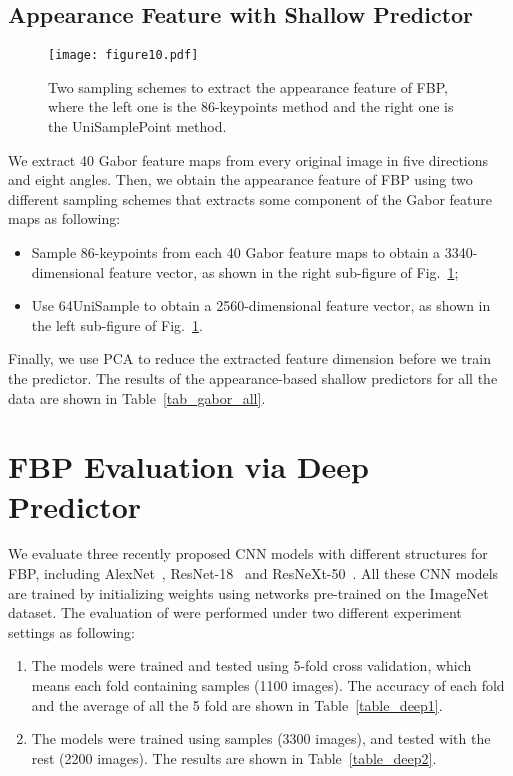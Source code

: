 \documentclass[10pt,conference,a4paper]{IEEEtran}
\begin{document}
\subsection{Appearance Feature with Shallow Predictor}
\begin{figure}[!t]
\centering
\texttt{[image: figure10.pdf]}
\caption{Two sampling schemes to extract the appearance feature of FBP, where the left one is the 86-keypoints method and the right one is the UniSamplePoint method.}
\label{fig_gabor_sample}
\end{figure}
We extract 40 Gabor feature maps from every original image in five directions and eight angles. Then, we obtain the appearance feature of FBP using two different sampling schemes that extracts some component of the Gabor feature maps as following:
\begin{itemize}
\item Sample 86-keypoints from each 40 Gabor feature maps to obtain a 3340-dimensional feature vector, as shown in the right sub-figure of Fig.~\ref{fig_gabor_sample};
\item Use 64UniSample to obtain a 2560-dimensional feature vector, as shown in the left sub-figure of Fig.~\ref{fig_gabor_sample}.
\end{itemize} Finally, we use PCA to reduce the extracted feature dimension before we train the predictor. The results of the appearance-based shallow predictors for all the data are shown in Table~\ref{tab_gabor_all}.







\section{FBP Evaluation via Deep Predictor}
We evaluate three recently proposed CNN models with different structures for FBP, including AlexNet~\cite{krizhevsky2012imagenet}, ResNet-18~\cite{he2016deep} and ResNeXt-50~\cite{xie2016aggregated}. All these CNN models are trained by initializing weights using networks pre-trained on the ImageNet dataset. The evaluation of were performed under two different experiment settings as following:
\begin{enumerate}
  \item The models were trained and tested using 5-fold cross validation, which means each fold containing  samples (1100 images). The accuracy of each fold and the average of all the 5 fold are shown in Table~\ref{table_deep1}.
  \item The models were trained using  samples (3300 images), and tested with the rest  (2200 images). The results are shown in Table~\ref{table_deep2}.
\end{enumerate}
\end{document}
